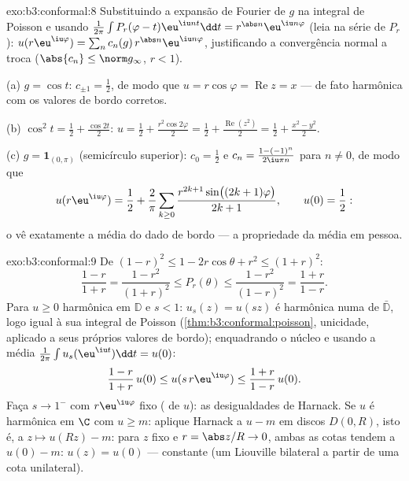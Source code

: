 \begin{solution}{exo:b3:conformal:8}
Substituindo a expansão de Fourier de $g$ na integral de Poisson
e usando
$\frac1{2\pi}\int P_r(\varphi - t)\eu^{\iu nt}\dd t =
r^{\abs n}\eu^{\iu n\varphi}$ (leia na série de $P_r$):
$u(r\eu^{\iu\varphi}) = \sum_nc_n(g)\,r^{\abs
n}\eu^{\iu n\varphi}$, justificando a convergência normal a
troca ($\abs{c_n} \leq \norm g_\infty$, $r < 1$).

(a) $g = \cos t$: $c_{\pm1} = \frac12$, de modo que $u =
r\cos\varphi = \operatorname{Re}z = x$ --- de fato harmônica
com os valores de bordo corretos.

(b) $\cos^2t = \frac12 + \frac{\cos 2t}2$: $u = \frac12 +
\frac{r^2\cos2\varphi}2 = \frac12 +
\frac{\operatorname{Re}(z^2)}2 = \frac12 + \frac{x^2 -
y^2}{2}$.

(c) $g = \mathbf 1_{(0,\pi)}$ (semicírculo superior): $c_0 =
\frac12$ e $c_n = \frac{1 - (-1)^n}{2\iu\pi n}$ para $n \neq
0$, de modo que
\[
u(r\eu^{\iu\varphi}) = \frac12 + \frac2\pi\sum_{k\geq0}
\frac{r^{2k+1}\sin\bigl((2k+1)\varphi\bigr)}{2k + 1},
\qquad u(0) = \frac12 :
\]
o  vê exatamente a média do dado de bordo ---
a propriedade da média em pessoa.
\end{solution}

\begin{solution}{exo:b3:conformal:9}
De $(1-r)^2 \leq 1 - 2r\cos\theta + r^2 \leq (1+r)^2$:
\[
\frac{1-r}{1+r} = \frac{1 - r^2}{(1+r)^2} \leq P_r(\theta)
\leq \frac{1 - r^2}{(1 - r)^2} = \frac{1+r}{1-r} .
\]
Para $u \geq 0$ harmônica em $\mathbb D$ e $s < 1$: $u_s(z) =
u(sz)$ é harmônica numa  de $\bar{\mathbb D}$,
logo igual à sua integral de Poisson
(\cref{thm:b3:conformal:poisson}, unicidade, aplicado a seus
próprios valores de bordo); enquadrando o núcleo e usando a
média $\frac1{2\pi}\int u_s(\eu^{\iu t})\dd t = u(0)$:
\[
\frac{1-r}{1+r}\,u(0) \leq u(s\,r\eu^{\iu\varphi}) \leq
\frac{1+r}{1-r}\,u(0).
\]
Faça $s \to 1^-$ com $r\eu^{\iu\varphi}$ fixo ( de
$u$): as desigualdades de Harnack. Se $u$ é harmônica em $\C$
com $u \geq m$: aplique Harnack a $u - m$ em discos $D(0, R)$,
isto é, a $z \mapsto u(Rz) - m$: para $z$ fixo e $r =
\abs z/R \to 0$, ambas as cotas tendem a $u(0) - m$: $u(z) =
u(0)$ --- constante (um Liouville bilateral a partir de uma cota
unilateral).
\end{solution}

